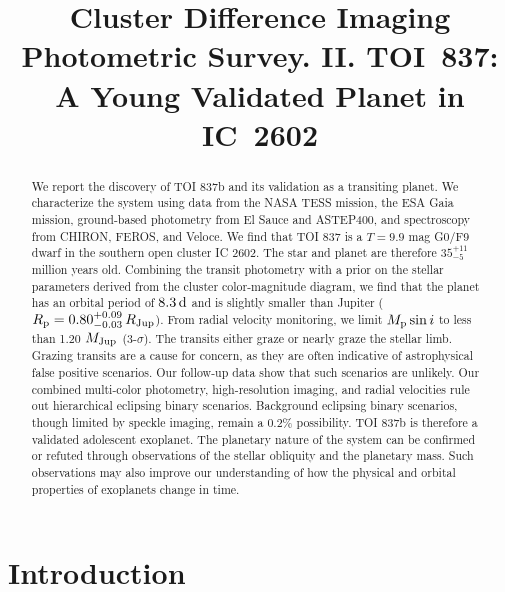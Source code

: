 \documentclass[12pt,twocolumn,tighten]{aastex63}
\begin{document}

\title{
  Cluster Difference Imaging Photometric Survey. II.
  TOI~837: A Young Validated Planet in IC~2602
}



\begin{abstract}
  We report the discovery of TOI 837b and its validation as a
  transiting planet.  We characterize the system using data from the
  NASA TESS mission, the ESA Gaia mission, ground-based photometry
  from El Sauce and ASTEP400, and spectroscopy from CHIRON, FEROS, and
  Veloce.  We find that TOI 837 is a $T=9.9$ mag G0/F9 dwarf in the
  southern open cluster IC 2602.  The star and planet are therefore
  $35^{+11}_{-5}$ million years old.  Combining the transit photometry
  with a prior on the stellar parameters derived from the cluster
  color-magnitude diagram, we find that the planet has an orbital
  period of $8.3\,{\rm d}$ and is slightly smaller than Jupiter
  ($R_{\rm p} = 0.80^{+0.09}_{-0.03} \,R_{\rm Jup}$).  From radial
  velocity monitoring, we limit $M_{\rm p}\sin i$ to less than 1.20
  $M_{\rm Jup}$ (3-$\sigma$).  The transits either graze or nearly
  graze the stellar limb.  Grazing transits are a cause for concern,
  as they are often indicative of astrophysical false positive
  scenarios.  Our follow-up data show that such scenarios are
  unlikely.  Our combined multi-color photometry, high-resolution
  imaging, and radial velocities rule out hierarchical eclipsing
  binary scenarios.  Background eclipsing binary scenarios, though
  limited by speckle imaging, remain a 0.2\% possibility.  TOI 837b is
  therefore a validated adolescent exoplanet.  The planetary nature of
  the system can be confirmed or refuted through observations of the
  stellar obliquity and the planetary mass.  Such observations may also
  improve our understanding of how the physical and orbital properties
  of exoplanets change in time.
\end{abstract}




\section{Introduction}
\end{document}
